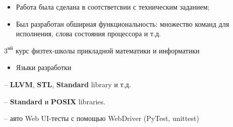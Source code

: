 \documentclass[10pt,a4paper,ragged2e,withhyper]{custom-altacv}
\begin{document}
\begin{paracol}{2}
\divider


\begin{itemize}
	\item Работа была сделана в соотстветсвии с техническим заданием;
	\item Был разработан обширная функциональность: множество команд для исполнения, слова состояния процессора и т.д.
\end{itemize}


\iffalse
\cvsection{Сертификаты и Дипломы}

\cvachievement{\faGraduationCap}{Участие в двух \textbf{международных} олимпиадах по астрономии}{IOAA и IAO}

\cvachievement{\faMedal}{Успешное завершение курса \cvtag{C++}}{Coursera -- <<Основы разработки на C++: Жёлтый пояс>>}

\cvachievement{\faMedal}{Успешное завершение курса \cvtag{Agile}}{Coursera -- <<Agile with Atlassian Jira>>}

\cvachievement{\faMedal}{Успешное завершение курса \cvtag{Java}}{JetBrains Academy -- <<Java for beginners>>}
\fi



\switchcolumn


$3^\text{ий}$ курс физтех-школы прикладной математики и информатики




\begin{itemize}
	\item \textcolor{emphasis}{Языки разработки} 
\end{itemize}

 -- \textbf{LLVM}, \textbf{STL}, \textbf{Standard} library и т.д.
\vspace{1ex}

 -- \textbf{Standard} и \textbf{POSIX} libraries.
\vspace{1ex}

 -- авто Web UI-тесты с помощью WebDriver (PyTest, unittest)
\vspace{1ex}


\end{paracol}
\end{document}
